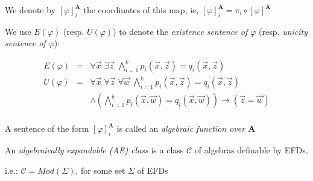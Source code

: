 \documentclass[12pt]{beamer}
\begin{document}
\begin{frame}

We denote by $[\varphi]^{\mathbf{A}}_i$ the coordinates of this map, ie, $[\varphi]^{\mathbf{A}}_i = \pi_i \circ [\varphi]^{\mathbf{A}}$

\bigskip

We use $E(\varphi)$ (resp. $U(\varphi)$) to denote the \textit{existence sentence of $\varphi$} (resp. \textit{unicity sentence of $\varphi$}):

\[
\begin{array}{rcl}
E(\varphi) & = & \forall \vec{x} \; \exists \vec{z}\;\bigwedge_{i=1}^{k}p_{i}(\vec{x},\vec{z})=q_{i}(\vec{x},\vec{z})\\
U(\varphi) & = & \forall \vec{x} \; \forall \vec{z} \; \forall \vec{w}\;
\bigwedge_{i=1}^{k}p_{i}(\vec{x},\vec{z})=q_{i}(\vec{x},\vec{z}) \\ 
& & \wedge (\bigwedge_{i=1}^{k}p_{i}(\vec{x},\vec{w})=q_{i}(\vec{x},\vec{w})) \rightarrow  (\vec{z} = \vec{w})\\
\end{array}
\]

\end{frame}

\begin{frame}

\begin{definition}

\bigskip

A sentence of the form $[\varphi]_{i}^\mathbf{A}$ is called an \textit{algebraic function over $\mathbf{A}$}

\pause

\bigskip

An \textit{algebraically expandable (AE) class} is a class $\mathcal{C}$ of algebras definable by EFDs, 

\bigskip
\pause

i.e.: $\mathcal{C}=Mod(\Sigma )$, for some set $\Sigma$ of EFDs  

\end{definition}

\end{frame}
\end{document}
